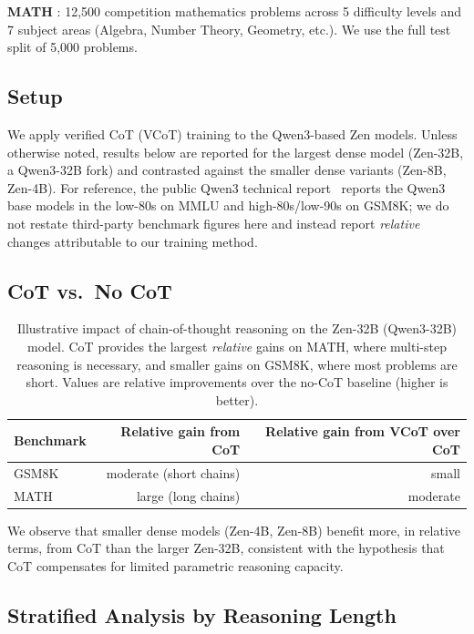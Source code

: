 \documentclass[11pt,a4paper]{article}
\begin{document}
\textbf{MATH} \cite{hendrycks2021math}: 12,500 competition mathematics problems across
5 difficulty levels and 7 subject areas (Algebra, Number Theory, Geometry, etc.).
We use the full test split of 5,000 problems.

\subsection{Setup}

We apply verified CoT (VCoT) training to the Qwen3-based Zen models. Unless otherwise
noted, results below are reported for the largest dense model (Zen-32B, a Qwen3-32B fork)
and contrasted against the smaller dense variants (Zen-8B, Zen-4B). For reference, the
public Qwen3 technical report~\cite{qwen3} reports the Qwen3 base models in the low-80s
on MMLU and high-80s/low-90s on GSM8K; we do not restate third-party benchmark figures
here and instead report \emph{relative} changes attributable to our training method.

\subsection{CoT vs.\ No CoT}

\begin{table}[H]
\centering
\caption{Illustrative impact of chain-of-thought reasoning on the Zen-32B (Qwen3-32B)
model. CoT provides the largest \emph{relative} gains on MATH, where multi-step
reasoning is necessary, and smaller gains on GSM8K, where most problems are short.
Values are relative improvements over the no-CoT baseline (higher is better).}
\begin{tabular}{lrr}
\toprule
\textbf{Benchmark} & \textbf{Relative gain from CoT} & \textbf{Relative gain from VCoT over CoT} \\
\midrule
GSM8K & moderate (short chains) & small \\
MATH  & large (long chains)     & moderate \\
\bottomrule
\end{tabular}
\label{tab:cot_vs_nocot}
\end{table}

We observe that smaller dense models (Zen-4B, Zen-8B) benefit more, in relative terms,
from CoT than the larger Zen-32B, consistent with the hypothesis that CoT compensates
for limited parametric reasoning capacity.

\subsection{Stratified Analysis by Reasoning Length}
\end{document}
